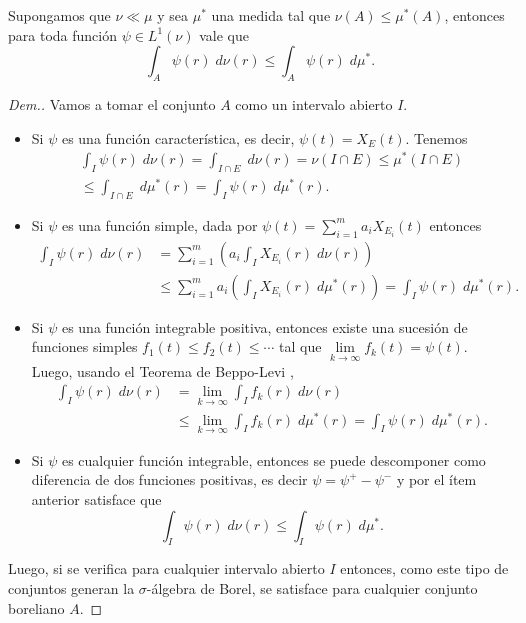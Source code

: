 \begin{lem}\label{obs3}
	Supongamos que  $\nu\ll\mu$ y sea $\mu^*$ una medida tal que $\nu(A)\leq \mu^*(A)$, entonces para toda función $\psi\in L^1(\nu)$ vale que 
	$$\int_A\psi(r)\;d\nu(r)\leq \int_A\psi(r)\;d\mu^*.$$
	
\end{lem}
\begin{proof}[Dem.]
 Vamos a  tomar el conjunto $A$ como un intervalo abierto $I$.
 
\begin{itemize}
	\item Si $\psi$ es una función característica, es decir, $\psi(t)=X_E(t)$. Tenemos
	\begin{multline*}
		\int_I \psi(r) \;d\nu(r)=\int_{I\cap E} \;d\nu(r)=\nu \left(I\cap E\right)\leq \mu^*\left(I\cap E\right)\\
		\leq\int_{I\cap E} \;d\mu^*(r)=\int_I\psi(r) \;d\mu^*(r).
	\end{multline*}
\item Si $\psi$ es una función simple, dada por $\psi(t)=\displaystyle\sum_{i=1}^{m}a_iX_{E_i}(t)$ entonces
\begin{equation*}
\begin{split}
	\int_I \psi(r)\; d\nu(r)&=\sum_{i=1}^{m}\left( a_i\int_IX_{E_i}(r) \;d\nu(r)\right) \\ &\leq
	\sum_{i=1}^{m}a_i\left( \int_IX_{E_i}(r) \;d\mu^*(r)\right) =\int_I \psi(r)\; d\mu^*(r).
 \end{split}
\end{equation*}
\item Si $\psi$ es una función integrable positiva, entonces existe una sucesión de funciones simples $f_1(t)\leq f_2(t)\leq\cdots$ tal que $\lim\limits_{k\to\infty}f_k(t)=\psi(t)$. Luego, usando  el Teorema de Beppo-Levi \cite[Teorema 5.6]{Zo},
\begin{equation*}
\begin{split}
	\int_I\psi(r)\;d\nu(r)&=\lim\limits_{k\to\infty}\int_I f_k(r)\;d\nu(r)\\
	&\leq \lim\limits_{k\to\infty}\int_I f_k(r)\;d\mu^*(r)=\int_I\psi(r)\;d\mu^*(r).
 \end{split}
\end{equation*}
	\item Si $\psi$ es cualquier función integrable, entonces se puede descomponer como diferencia de dos funciones positivas, es decir $\psi=\psi^+-\psi^-$  y por el ítem anterior satisface  que 
$$\int_I\psi(r)\;d\nu(r)\leq \int_I\psi(r)\;d\mu^*.$$	
\end{itemize}
Luego, si se verifica para cualquier intervalo  abierto $I$ entonces,  como  este tipo de conjuntos generan la $\sigma$-álgebra de Borel, se satisface para cualquier conjunto boreliano $A$.


\end{proof} 








